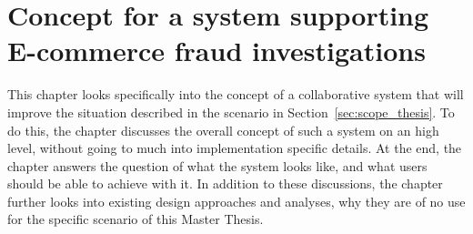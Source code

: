 
\chapter{Concept for a system supporting \gls{E-commerce} fraud investigations} %
\label{cha:system_concept}

This chapter looks specifically into the concept of a collaborative system that will improve the situation described in the scenario in Section~\ref{sec:scope_thesis}. To do this, the chapter discusses the overall concept of such a system on an high level, without going to much into implementation specific details. At the end, the chapter answers the question of what the system looks like, and what users should be able to achieve with it. In addition to these discussions, the chapter further looks into existing design approaches and analyses, why they are of no use for the specific scenario of this Master Thesis.











